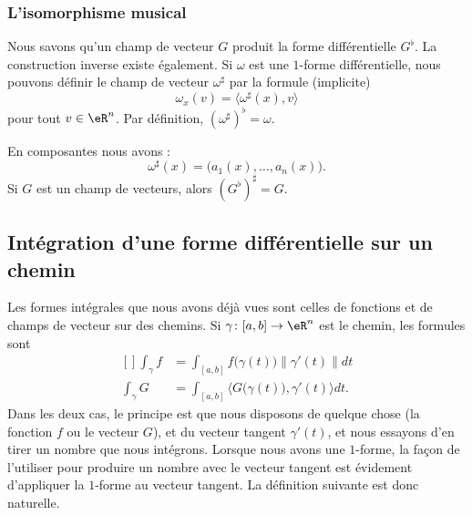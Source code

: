 \subsubsection{L'isomorphisme musical}

Nous savons qu'un champ de vecteur $G$ produit la forme différentielle $G^{\flat}$. La construction inverse existe également. Si $\omega$ est une $1$-forme différentielle, nous pouvons définir le champ de vecteur $\omega^{\sharp}$ par la formule (implicite)
\begin{equation}
	\omega_x(v)=\langle \omega^{\sharp}(x), v\rangle 
\end{equation}
pour tout $v\in\eR^n$. Par définition, $(\omega^{\sharp})^{\flat}=\omega$. 

\begin{lemma}
    En composantes nous avons :
	\begin{equation}
		\omega^{\sharp}(x)=\big( a_1(x),\ldots,a_n(x) \big).
	\end{equation}
	Si $G$ est un champ de vecteurs, alors $(G^{\flat})^{\sharp}=G$.
\end{lemma}

\subsection{Intégration d'une forme différentielle sur un chemin}

Les formes intégrales que nous avons déjà vues sont celles de fonctions et de champs de vecteur sur des chemins. Si $\gamma\colon [a,b]\to \eR^n$ est le chemin, les formules sont
\begin{equation}
	\begin{aligned}[]
		\int_{\gamma}f&=\int_{[a,b]}f\big( \gamma(t) \big)\| \gamma'(t) \|dt\\
		\int_{\gamma}G&=\int_{[a,b]}\langle G\big( \gamma(t) \big), \gamma'(t)\rangle dt.
	\end{aligned}
\end{equation}
Dans les deux cas, le principe est que nous disposons de quelque chose (la fonction $f$ ou le vecteur $G$), et du vecteur tangent $\gamma'(t)$, et nous essayons d'en tirer un nombre que nous intégrons. Lorsque nous avons une $1$-forme, la façon de l'utiliser pour produire un nombre avec le vecteur tangent est évidement d'appliquer la $1$-forme au vecteur tangent. La définition suivante est donc naturelle.

